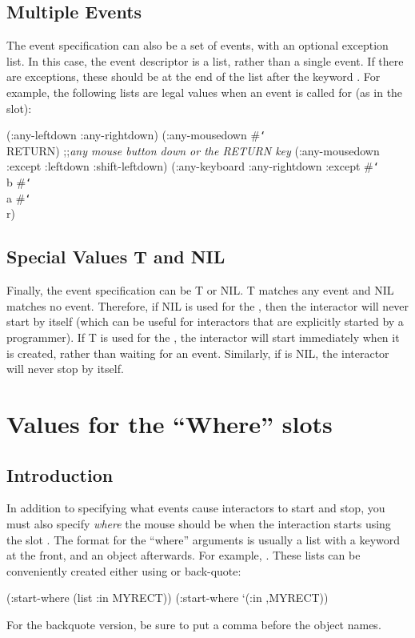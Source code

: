 \subsection{Multiple Events}
The event specification can also be a set of events, with an
optional exception list.
In this case, the event descriptor is a list, rather than a single event.
If there are exceptions, these should be at the end of the list after the
keyword .
For example, the following lists are legal values when an event is called
for (as in the  slot):
\begin{programexample}
   (:any-leftdown :any-rightdown)
   (:any-mousedown \#{\tt\char`\\}RETURN)   ;;{\it any mouse button down or the RETURN key}
   (:any-mousedown :except :leftdown :shift-leftdown)
   (:any-keyboard :any-rightdown :except \#{\tt\char`\\}b \#{\tt\char`\\}a \#{\tt\char`\\}r)
\end{programexample}


\subsection{Special Values T and NIL}

Finally, the event specification can be T or NIL.  T matches any event and
NIL matches no event.  Therefore, if NIL is used for the ,
then the interactor will never start by itself (which can be useful for
interactors that are explicitly started by a programmer).  If T is used for
the , the interactor will start immediately when it is
created, rather than waiting for an event.  Similarly, if
 is NIL, the interactor will never stop by itself.


\section{Values for the ``Where'' slots}
\label{where}
\label{startwhere}

\subsection{Introduction}
In addition to specifying what events cause interactors to start and stop,
you must also specify {\it where} the mouse should be when the interaction
starts using the slot .
The format for the ``where'' arguments is usually a list with a keyword at
the front, and an object afterwards.  For example, .
These lists can be conveniently created either using  or
back-quote:
\begin{programexample}
(:start-where (list :in MYRECT))
(:start-where `(:in ,MYRECT))
\end{programexample}
For the backquote version, be sure to put a comma before the object names.

